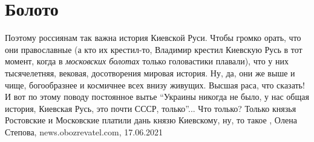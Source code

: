  
 
 
 
 
\chapter{Болото}
\label{sec:slova.boloto}

Поэтому россиянам так важна история Киевской Руси. Чтобы громко орать, что они
православные (а кто их крестил-то, Владимир крестил Киевскую Русь в тот момент,
когда в \emph{московских болотах} только головастики плавали), что у них тысячелетняя,
вековая, досотворения мировая история. Ну, да, они же выше и чище, богообразнее
и космичнее всех внизу живущих. Высшая раса, что сказать!  И вот по этому
поводу постоянное вытье \enquote{Украины никогда не было, у нас общая история, Киевская
Русь, это почти СССР, только}... Что только? Только князья Ростовские и
Московские платили дань князю Киевскому, ну, то такое
, 
Олена Степова, news.obozrevatel.com, 17.06.2021
